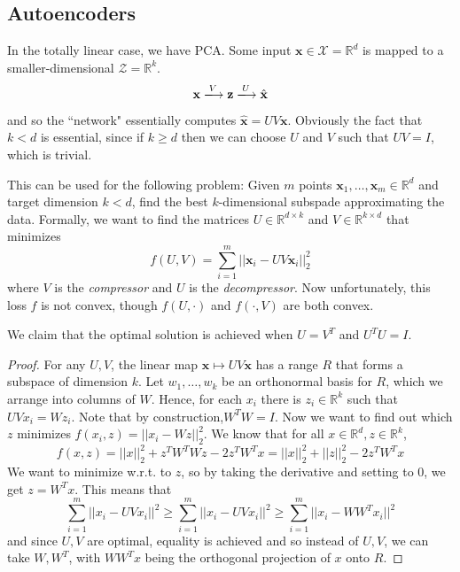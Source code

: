 \documentclass{article}
\begin{document}
\subsection{Autoencoders}

  In the totally linear case, we have PCA. Some input $\mathbf{x} \in \mathcal{X} = \mathbb{R}^d$ is mapped to a smaller-dimensional $\mathcal{Z} = \mathbb{R}^k$. 
  \[\mathbf{x} \xlongrightarrow[]{V} \mathbf{z} \xlongrightarrow{U} \hat{\mathbf{x}}\]
  and so the ``network" essentially computes $\hat{\mathbf{x}} = U V \mathbf{x}$. Obviously the fact that $k < d$ is essential, since if $k \geq d$ then we can choose $U$ and $V$ such that $UV = I$, which is trivial. 

  This can be used for the following problem: Given $m$ points $\mathbf{x}_1, \ldots, \mathbf{x}_m \in \mathbb{R}^d$ and target dimension $k < d$, find the best $k$-dimensional subspade approximating the data. Formally, we want to find the matrices $U \in \mathbb{R}^{d \times k}$ and $V \in \mathbb{R}^{k \times d}$ that minimizes 
  \[f(U, V) = \sum_{i=1}^m ||\mathbf{x}_i - U V \mathbf{x}_i||_2^2 \] 
  where $V$ is the \textit{compressor} and $U$ is the \textit{decompressor}. Now unfortunately, this loss $f$ is not convex, though $f(U, \cdot)$ and $f(\cdot, V)$ are both convex. 

  \begin{theorem}
  We claim that the optimal solution is achieved when $U = V^T$ and $U^T U = I$. 
  \end{theorem}
  \begin{proof}
      For any $U, V$, the linear map $\mathbf{x} \mapsto U V \mathbf{x}$ has a range $R$ that forms a subspace of dimension $k$. Let $w_1, \ldots,w_k$ be an orthonormal basis for $R$, which we arrange into columns of $W$. Hence, for each $x_i$ there is $z_i \in \mathbb{R}^k$ such that $UV x_i = W z_i$. Note that by construction,$W^T W = I$. Now we want to find out which $z$ minimizes $f(x_i, z) = ||x_i - W z||_2^2$. We know that for all $x \in \mathbb{R}^d, z \in \mathbb{R}^k$, 
  \[f(x, z) = ||x||_2^2 + z^T W^T W z - 2 z^T W^T x = ||x||_2^2 + ||z||_2^2 - 2 z^T W^T x\] 
  We want to minimize w.r.t. to $z$, so by taking the derivative and setting to $0$, we get $z = W^T x$. This means that 
  \[\sum_{i=1}^m ||x_i - U V x_i ||^2 \geq \sum_{i=1}^m ||x_i - UV x_i||^2 \geq \sum_{i=1}^m ||x_i - W W^T x_i||^2\] 
  and since $U, V$ are optimal, equality is achieved and so instead of $U, V$, we can take $W, W^T$, with $W W^T x$ being the orthogonal projection of $x$ onto $R$. 
  \end{proof}
\end{document}
